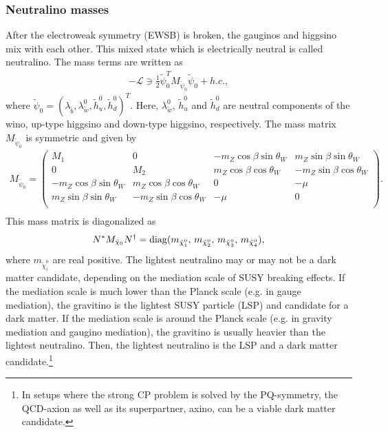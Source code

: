 \documentclass[preprint,3p,12pt]{elsarticle}
\begin{document}
{\subsubsection{Neutralino masses}
After the electroweak symmetry (EWSB) is broken, the gauginos and higgsino mix with each other. 
This mixed state which is electrically neutral is called neutralino. The mass terms are written as
\begin{eqnarray}
-\mathcal{L} \ni \frac{1}{2}\tilde \psi_0^T M_{\tilde \psi_0} \tilde \psi_0 + h.c.,
\end{eqnarray}
where $\tilde \psi_0 = (\lambda_{\tilde b}, \lambda_{\tilde w}^0, \tilde h_u^0, \tilde h_d^0)^T$. Here, $\lambda_{\tilde w}^0$, $\tilde h_u^0$ and $\tilde h_d^0$ are neutral components of the wino, up-type higgsino and down-type higgsino, respectively. The mass matrix $M_{\tilde \psi_0}$ is symmetric and given by
\begin{eqnarray}
M_{\tilde \psi_0} = 
\left(
\begin{array}{cccc}
M_1  &  0  & -m_Z \cos\beta\sin\theta_W & m_Z \sin\beta\sin\theta_W   \\
0  &  M_2  & m_Z \cos\beta \cos\theta_W & -m_Z\sin\beta \cos\theta_W \\
-m_Z \cos\beta\sin\theta_W &  m_Z\cos\beta \cos\theta_W  &  0& -\mu \\
 m_Z\sin\beta\sin\theta_W &  -m_Z\sin\beta \cos\theta_W  &  -\mu  & 0\\
\end{array}
\right). \nonumber \\
\end{eqnarray}
This mass matrix is diagonalized as
\begin{eqnarray}
N^* M_{\tilde \chi_0} N^\dag = {\rm diag}(m_{\tilde \chi_1^0},\,
m_{\tilde \chi_2^0}, \,
m_{\tilde \chi_3^0},\, m_{\tilde \chi_4^0}),
\end{eqnarray}
where $m_{\tilde \chi_i^0}$ are real positive. 
%
%
The lightest neutralino may or may not be a dark matter candidate, depending on the mediation scale of SUSY breaking effects.  
If the mediation scale is much lower than the Planck scale (e.g. in gauge mediation), 
the gravitino is the lightest SUSY particle (LSP) and candidate for a dark matter. 
If the mediation scale is around the Planck scale (e.g. in gravity mediation and gaugino mediation), 
the gravitino is usually heavier than the lightest neutralino. Then, the lightest neutralino is the LSP and a dark matter candidate.\footnote{
%
In setups where the strong CP problem is solved by the PQ-symmetry, 
the QCD-axion as well as its superpartner, axino, can be a viable dark matter candidate.  
%
} 




}
\end{document}
